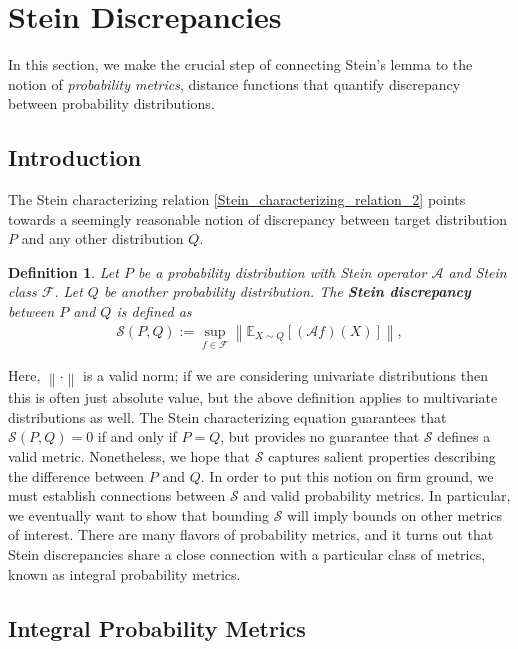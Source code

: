 \documentclass[12pt]{article}
\newcommand*{\norm}[1]{\left\lVert#1\right\rVert}
\newcommand{\E}{\mathbb{E}}
\newcommand{\functionSpace}{\mathcal{F}}
\newcommand{\steinOperator}{\mathcal{A}}
\newcommand{\dist}{P}
\newcommand{\distApprox}{Q}
\newcommand{\steinDisc}{\mathcal{S}}
\newtheorem{definition}{Definition}
\begin{document}
 
\section{Stein Discrepancies}
In this section, we make the crucial step of connecting Stein's lemma to the notion of \textit{probability metrics}, distance functions that quantify discrepancy between 
probability distributions. 

\subsection{Introduction}
The Stein characterizing relation \ref{Stein_characterizing_relation_2} points towards a seemingly reasonable notion of discrepancy between target distribution $\dist$ and 
any other distribution $\distApprox$. 

\begin{definition}
Let $\dist$ be a probability distribution with Stein operator $\steinOperator$ and Stein class $\functionSpace$. Let $\distApprox$ be another probability distribution. 
The \textbf{Stein discrepancy} between $\dist$ and $\distApprox$ is defined as 
\begin{align}
\steinDisc(\dist, \distApprox) := \sup_{f \in \functionSpace} \norm{\E_{X \sim \distApprox} \left[(\steinOperator f)(X) \right]},
\end{align}
\end{definition}
Here, $\norm{\cdot}$ is a valid norm; if we are considering univariate distributions then this is often just absolute value, but the above definition applies to multivariate distributions 
as well. 
The Stein characterizing equation guarantees that $\steinDisc(\dist, \distApprox) = 0$ if and only if $\dist = \distApprox$, but provides no guarantee that $\steinDisc$ defines a valid 
metric. Nonetheless, we hope that $\steinDisc$ captures salient properties describing the difference between $\dist$ and $\distApprox$. In order to put this notion on firm ground, we 
must establish connections between $\steinDisc$ and valid probability metrics. In particular, we eventually want to show that bounding $\steinDisc$ will imply bounds on other metrics of 
interest. There are many flavors of probability metrics, and it turns out that Stein discrepancies share a close connection with a particular class of metrics, known as integral probability 
metrics. 

\subsection{Integral Probability Metrics}
\end{document}
